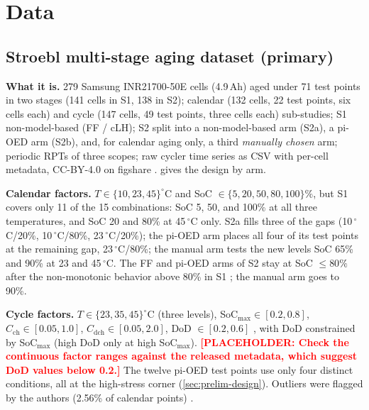 \documentclass[11pt,letterpaper]{article}
\newcommand{\ph}[1]{\textcolor{red}{\textbf{[PLACEHOLDER: #1]}}}
\begin{document}
\section{Data}\label{sec:data}

\subsection{Stroebl multi-stage aging dataset (primary)}\label{sec:data-stroebl}
\textbf{What it is.} 279 Samsung INR21700-50E cells (4.9\,Ah) aged under 71 test points in two stages (141 cells in S1, 138 in S2); calendar (132 cells, 22 test points, six cells each) and cycle (147 cells, 49 test points, three cells each) sub-studies; S1 non-model-based (FF / cLH); S2 split into a non-model-based arm (S2a), a pi-OED arm (S2b), and, for calendar aging only, a third \emph{manually chosen} arm; periodic RPTs of three scopes; raw cycler time series as CSV with per-cell metadata, CC-BY-4.0 on figshare \cite{stroebl2024}.  gives the design by arm.

\textbf{Calendar factors.} $T\in\{10,23,45\}^\circ$C and SoC $\in\{5,20,50,80,100\}\%$, but S1 covers only 11 of the 15 combinations: SoC 5, 50, and 100\% at all three temperatures, and SoC 20 and 80\% at 45\,$^\circ$C only. S2a fills three of the gaps (10\,$^\circ$C/20\%, 10\,$^\circ$C/80\%, 23\,$^\circ$C/20\%); the pi-OED arm places all four of its test points at the remaining gap, 23\,$^\circ$C/80\%; the manual arm tests the new levels SoC 65\% and 90\% at 23 and 45\,$^\circ$C. The FF and pi-OED arms of S2 stay at SoC $\le80\%$ after the non-monotonic behavior above 80\% in S1 \cite{stroebl2026}; the manual arm goes to 90\%.

\textbf{Cycle factors.} $T\in\{23,35,45\}^\circ$C (three levels), SoC$_{\max}\in[0.2,0.8]$, $C_{\mathrm{ch}}\in[0.05,1.0]$, $C_{\mathrm{dch}}\in[0.05,2.0]$, DoD $\in[0.2,0.6]$ \cite{stroebl2026}, with DoD constrained by SoC$_{\max}$ (high DoD only at high SoC$_{\max}$). \ph{Check the continuous factor ranges against the released metadata, which suggest DoD values below 0.2.} The twelve pi-OED test points use only four distinct conditions, all at the high-stress corner (\cref{sec:prelim-design}). Outliers were flagged by the authors (2.56\% of calendar points) \cite{stroebl2026}.
\end{document}
